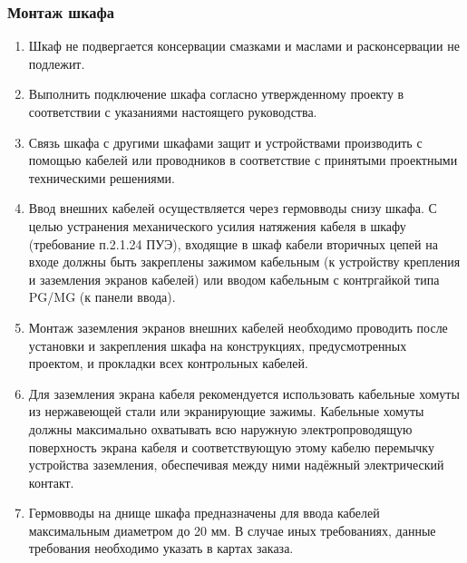 \subsubsection{Монтаж шкафа}

\begin{enumerate}[label=\arabic{section}.\arabic{subsection}.\arabic{subsubsection}.\arabic*, align=left, labelsep=4pt, leftmargin=0pt, itemindent=2cm]

\item
Шкаф не подвергается консервации смазками и маслами и расконсервации не подлежит.

\item
Выполнить подключение шкафа согласно утвержденному проекту в соответствии с указаниями настоящего руководства. 

\item
Связь шкафа с другими шкафами защит и устройствами производить с помощью кабелей или проводников в соответствие с принятыми проектными техническими решениями.

\item
Ввод внешних кабелей осуществляется через гермовводы снизу шкафа.
С целью устранения механического усилия натяжения кабеля в шкафу (требование п.2.1.24 ПУЭ), входящие в шкаф кабели вторичных цепей на входе должны быть закреплены зажимом кабельным (к устройству крепления и заземления экранов кабелей) или вводом кабельным с контргайкой типа PG/MG (к панели ввода).

\item
Монтаж заземления экранов внешних кабелей необходимо проводить после установки и закрепления шкафа на конструкциях, предусмотренных проектом, и прокладки всех контрольных кабелей.

\item
Для заземления экрана кабеля рекомендуется использовать кабельные хомуты из нержавеющей стали или экранирующие зажимы.
Кабельные хомуты должны максимально охватывать всю наружную электропроводящую поверхность экрана кабеля и соответствующую этому кабелю перемычку устройства заземления, обеспечивая между ними надёжный электрический контакт.

\item
Гермовводы на днище шкафа предназначены для ввода кабелей максимальным диаметром до 20 мм.
В случае иных требованиях, данные требования необходимо указать в картах заказа.


\end{enumerate}


